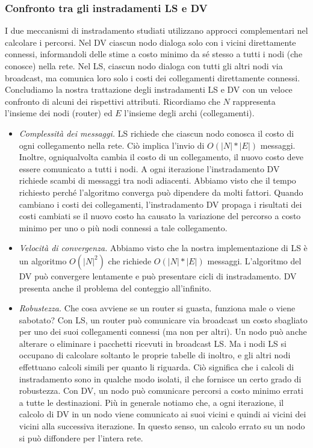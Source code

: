 \subsubsection{Confronto tra gli instradamenti LS e DV}
I due meccanismi di instradamento studiati utilizzano approcci complementari nel calcolare i percorsi. Nel DV ciascun nodo dialoga solo con i vicini direttamente connessi, informandoli delle stime a costo minimo da sé stesso a tutti i nodi (che conosce) nella rete. Nel LS, ciascun nodo dialoga con tutti gli altri nodi via broadcast, ma comunica loro solo i costi dei  collegamenti direttamente connessi. Concludiamo la nostra trattazione degli instradamenti LS e DV con un veloce confronto di alcuni dei rispettivi attributi. Ricordiamo che $N$ rappresenta l’insieme dei nodi (router) ed $E$ l’insieme degli archi (collegamenti).
\begin{itemize}
    \item \textit{Complessità dei messaggi.} LS richiede che ciascun nodo conosca il costo di ogni collegamento nella rete. Ciò implica l’invio di $O(|N|*|E|)$ messaggi. Inoltre, ogniqualvolta cambia il costo di un collegamento, il nuovo costo deve essere comunicato a tutti i nodi. A ogni iterazione l’instradamento DV richiede scambi di messaggi tra nodi adiacenti. Abbiamo visto che il tempo richiesto perché l’algoritmo converga può dipendere da molti fattori. Quando cambiano i costi dei collegamenti, l’instradamento DV propaga i risultati dei costi cambiati se il nuovo costo ha causato la variazione del percorso a costo minimo per uno o più nodi connessi a tale collegamento.
    \item \textit{Velocità di convergenza.} Abbiamo visto che la nostra implementazione di LS è un algoritmo $O(|N|^2)$ che richiede $O(|N|*|E|)$ messaggi. L’algoritmo del DV può convergere lentamente e può presentare cicli di instradamento. DV presenta anche il problema del conteggio all’infinito.
    \item \textit{Robustezza.} Che cosa avviene se un router si guasta, funziona male o viene sabotato? Con LS, un router può comunicare via broadcast un costo sbagliato per uno dei suoi collegamenti connessi (ma non per altri). Un nodo può anche alterare o eliminare i pacchetti ricevuti in broadcast LS. Ma i nodi LS si occupano di calcolare soltanto le proprie tabelle di inoltro, e gli altri nodi effettuano calcoli simili per quanto li riguarda. Ciò significa che i calcoli di instradamento sono in qualche modo isolati, il che fornisce un certo grado di robustezza. Con DV, un nodo può comunicare percorsi a costo minimo errati a tutte le destinazioni. Più in generale notiamo che, a ogni iterazione, il calcolo di DV in un nodo viene comunicato ai suoi vicini e quindi ai vicini dei vicini alla successiva iterazione. In questo senso, un calcolo errato su un nodo si può diffondere per l’intera rete.
\end{itemize}

